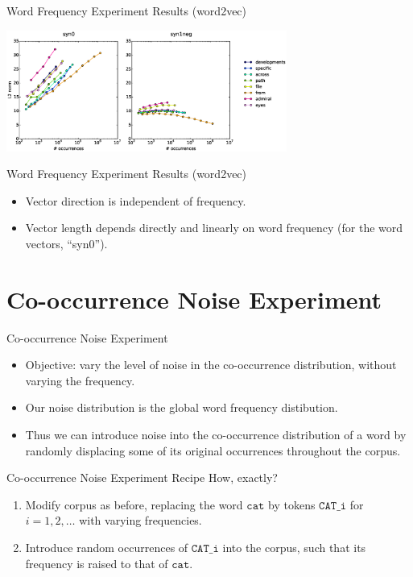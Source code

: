\documentclass{beamer}
\newcommand{\word}[1]{\texttt{#1}}
\begin{document}
\begin{frame}{Word Frequency Experiment Results (word2vec)}
	\begin{center}
	\includegraphics[height=150px]{word-frequency-experiment-graph} \\
	\end{center}
\end{frame}

\begin{frame}{Word Frequency Experiment Results (word2vec)}
	\begin{itemize}
		\item Vector direction is independent of frequency.
		\item Vector length depends directly and linearly on word frequency (for the word vectors, ``syn0'').
	\end{itemize}
\end{frame}

\section{Co-occurrence Noise Experiment}

\begin{frame}{Co-occurrence Noise Experiment}
\begin{itemize}
	\item Objective: vary the level of noise in the co-occurrence distribution, without varying the frequency.
	\item Our noise distribution is the global word frequency distibution.
	\item Thus we can introduce noise into the co-occurrence distribution of a word by randomly displacing some of its original occurrences throughout the corpus.
\end{itemize}
\end{frame}

\begin{frame}{Co-occurrence Noise Experiment Recipe}
How, exactly?
\begin{enumerate}
	\item Modify corpus as before, replacing the word $\word{cat}$ by tokens $\word{CAT\_i}$ for $i = 1, 2, \dots$ with varying frequencies.
	\item Introduce random occurrences of $\word{CAT\_i}$ into the corpus, such that its frequency is raised to that of $\word{cat}$.
\end{enumerate}
\end{frame}
\end{document}
